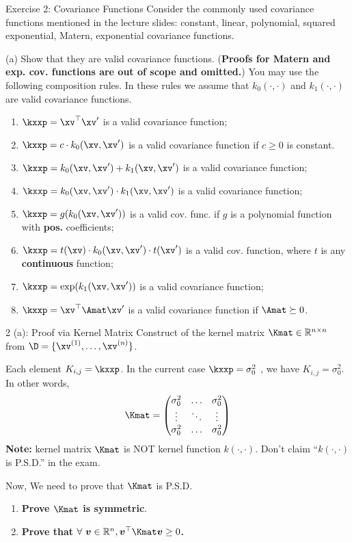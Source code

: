 \documentclass[aspectratio=169]{beamer}
\newcommand{\xvp}{\xv^\prime}
\newcommand{\kz}{k_0}
\newcommand{\ko}{k_1}
\newcommand{\kzxxp}{\kz(\xv, \xvp)}
\newcommand{\koxxp}{\ko(\xv, \xvp)}
\newcommand{\Kij}{K_{i,j}}
\newcommand{\vv}{\bm{v}}
\begin{document}
\begin{frame}{Exercise 2: Covariance Functions}
	\small
	Consider the commonly used covariance functions mentioned in the lecture slides: constant, linear, polynomial, squared exponential, Matern, exponential covariance functions.
	\vspace{1em}

	(a) Show that they are valid covariance functions. (\textbf{Proofs for Matern and exp. cov. functions are out of scope and omitted.}) You may use the following composition rules. In these rules we assume that $k_0(\cdot, \cdot)$ and $k_1(\cdot, \cdot)$ are valid covariance functions.
	\begin{enumerate}
		\item $\kxxp = \xv^\top \xvp$ is a valid covariance function;
		\item $\kxxp = c \cdot \kzxxp$ is a valid covariance function if $c \geq 0$ is constant.
		\item $\kxxp = \kzxxp + \koxxp$ is a valid covariance function;
		\item $\kxxp = \kzxxp \cdot \koxxp$ is a valid covariance function;
		\item $\kxxp = g(\kzxxp)$ is a valid cov. func. if $g$ is a polynomial function with \textbf{pos.} coefficients;
		\item $\kxxp = t(\xv) \cdot \kzxxp \cdot t(\xvp)$ is a valid cov. function, where $t$ is any \textbf{continuous} function;
		\item $\kxxp = \exp(\koxxp)$ is a valid covariance function;
		\item $\kxxp = \xv^\top \Amat \xvp$ is a valid covariance function if $\Amat \succeq 0$.
	\end{enumerate}
\end{frame}

\begin{frame}{2 (a): Proof via Kernel Matrix}
	\small
	Construct of the kernel matrix $\Kmat \in \mathbb{R}^{n \times n}$ from $\D = \{\xv^{(1)}, \ldots, \xv^{(n)} \}$.
	
	Each element $\Kij = \kxxp$. In the current case $\kxxp = \sigma_0^2$ , we have $\Kij = \sigma_0^2$. In other words, 
	\begin{equation*}
		\Kmat = \begin{pmatrix}
			\sigma_0^2 & \ldots & \sigma_0^2 \\
			\vdots & \ddots & \vdots \\
			\sigma_0^2 & \ldots & \sigma_0^2 \\
		\end{pmatrix}
	\end{equation*}
	\textbf{Note:} kernel matrix $\Kmat$ is NOT kernel function $k(\cdot, \cdot)$. Don't claim ``$k(\cdot, \cdot)$ is P.S.D.'' in the exam. 
	 
	 Now, We need to prove that $\Kmat$ is P.S.D.
	\begin{enumerate}
		\item \textbf{Prove $\Kmat$ is symmetric}. 
		\item \textbf{Prove that $\forall \ \vv \in \mathbb{R}^n, \vv^\top \Kmat \vv \geq 0$.}
	\end{enumerate}
\end{frame}
\end{document}
